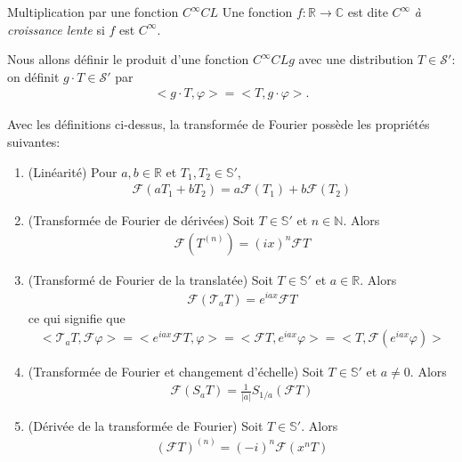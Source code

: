 \begin{myDefinition}
	Multiplication par une fonction $C^\infty CL$ 
	Une fonction $f:\mathbb R\rightarrow\mathbb C$ est dite $C^\infty$ \emph{à croissance lente} si $f$ est $C^\infty$.
	
Nous allons définir le produit d'une fonction $C^\infty CL g$ avec une distribution $T\in\mathcal S'$: on définit $g\cdot T\in\mathcal S'$ par
\begin{eqnarray}
	<g\cdot T,\varphi>=<T,g\cdot \varphi>.
\end{eqnarray}
\end{myDefinition}


\begin{myProposition}
	Avec les définitions ci-dessus, la transformée de Fourier possède les propriétés suivantes:
	\begin{enumerate}
		\item (Linéarité) Pour $a,b\in\mathbb R$ et $T_1,T_2\in\mathbb S'$,
		\begin{eqnarray}
			\mathcal F(aT_1+bT_2)=a\mathcal F(T_1)+b\mathcal F(T_2)
		\end{eqnarray}
		\item (Transformée de Fourier de dérivées)
		Soit $T\in\mathbb S'$ et $n\in\mathbb N$. Alors
		\begin{eqnarray}
			\mathcal F(T^{(n)})=(ix)^n\mathcal FT 
		\end{eqnarray}
		\item (Transformé de Fourier de la translatée) Soit $T\in\mathbb S'$ et $a\in\mathbb R$. Alors
		\begin{eqnarray}
			\mathcal F(\mathcal T_aT)=e^{iax}\mathcal FT 
		\end{eqnarray}
		ce qui signifie que 
		\begin{eqnarray}
			<\mathcal T_aT,\mathcal F\varphi>=<e^{iax}\mathcal FT,\varphi>=<\mathcal FT,e^{iax}\varphi>=<T,\mathcal F(e^{iax}\varphi)> 
		\end{eqnarray}
		\item (Transformée de Fourier et changement d'échelle)
		Soit $T\in\mathbb S'$ et $a\neq0$. Alors
		\begin{eqnarray}
			\mathcal F(S_aT)=\frac{1}{|a|}S_{1/a}(\mathcal FT)
		\end{eqnarray}
		
		\item (Dérivée de la transformée de Fourier)
		Soit $T\in\mathbb S'$. Alors
		\begin{eqnarray}
			(\mathcal FT)^{(n)}=(-i)^n\mathcal F(x^nT)
		\end{eqnarray}
	\end{enumerate}
\end{myProposition}

